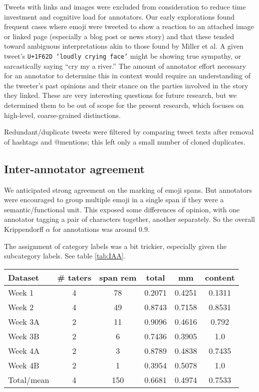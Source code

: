 \documentclass[11pt]{article}
\begin{document}
Tweets with links and images were excluded from consideration to reduce time investment and cognitive load for annotators. Our early explorations found frequent cases where emoji were tweeted to show a reaction to an attached image or linked page (especially a blog post or news story) and that these tended toward ambiguous interpretations akin to those found by Miller et al. A given tweet's \texttt{U+1F62D `loudly crying face'} might be showing true sympathy, or sarcastically saying ``cry my a river.'' The amount of annotator effort necessary for an annotator to determine this in context would require an understanding of the tweeter's past opinions and their stance on the parties involved in the story they linked. These are very interesting questions for future research, but we determined them to be out of scope for the present research, which focuses on high-level, coarse-grained distinctions.

Redundant/duplicate tweets were filtered by comparing tweet texts after removal of hashtags and @mentions; this left only a small number of cloned duplicates.

\subsection{Inter-annotator agreement}

We anticipated strong agreement on the marking of emoji spans. But annotators were encouraged to group multiple emoji in a single span if they were a semantic/functional unit.
This exposed some differences of opinion, with one annotator tagging a pair of characters together, another separately. So the overall Krippendorff $\alpha$ for annotations was around 0.9. 

The assignment of category labels was a bit trickier, especially given the subcategory labels. See table \ref{tab:IAA}.

\begin{table*}[t]
  \centering
  \begin{tabular}{@{} |lccccc| @{}}
    \hline
    Dataset & \# taters & span rem & total & mm & content \\
    \hline
    Week 1     & 4 & 78 & 0.2071  & 0.4251  & 0.1311  \\
    Week 2     & 4 & 49 & 0.8743  & 0.7158  & 0.8531  \\
    Week 3A    & 2 & 11 & 0.9096  & 0.4616  & 0.792  \\
    Week 3B    & 2 & 6  & 0.7436  & 0.3905  & 1.0  \\
    Week 4A    & 2 & 3  & 0.8789  & 0.4838  & 0.7435  \\
    Week 4B    & 2 & 1  & 0.3954  & 0.5078  & 1.0  \\
    \hline
    Total/mean & 4 & 150 & 0.6681 & 0.4974  & 0.7533  \\
    \hline
  \end{tabular}
  \caption{Fleiss's $\kappa$ scores and other annotation numbers}
  \label{tab:IAA}
\end{table*}
\end{document}
